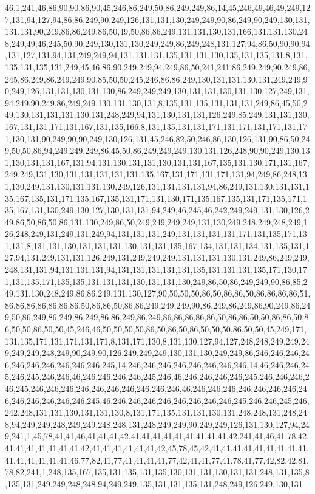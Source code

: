 46,1,241,46,86,90,90,86,90,45,246,86,249,50,86,249,249,86,14,45,246,49,46,49,249,127,131,94,127,94,86,86,249,90,249,126,131,131,130,249,249,90,86,249,90,249,130,131,131,131,90,249,86,86,249,86,50,49,50,86,86,249,131,131,130,131,166,131,131,130,248,249,49,46,245,50,90,249,130,131,130,249,249,86,249,248,131,127,94,86,50,90,90,94,131,127,131,94,131,249,249,94,131,131,131,135,131,131,130,135,131,135,131,8,131,135,131,135,131,249,45,46,86,90,249,249,94,249,86,50,241,241,86,249,249,90,249,86,245,86,249,86,249,249,90,85,50,50,245,246,86,86,249,130,131,131,130,131,249,249,90,249,126,131,131,130,131,130,86,249,249,249,130,131,131,130,131,130,127,249,131,94,249,90,249,86,249,249,130,131,130,131,8,135,131,135,131,131,131,249,86,45,50,249,130,131,131,131,130,131,248,249,94,131,130,131,131,126,249,85,249,131,131,130,167,131,131,171,131,167,131,135,166,8,131,135,131,131,171,131,171,131,171,131,171,130,131,90,249,90,90,249,130,126,131,45,246,82,50,246,86,130,126,131,90,86,50,249,50,50,86,94,249,249,249,86,45,50,86,249,249,249,130,131,126,248,90,90,249,130,131,130,131,131,167,131,94,131,130,131,131,130,131,131,167,135,131,130,171,131,167,249,249,131,130,131,131,131,131,131,135,167,131,171,131,171,131,94,249,86,248,131,130,249,131,130,131,131,130,249,126,131,131,131,131,94,86,249,131,130,131,131,135,167,135,131,171,135,167,135,131,171,131,130,171,135,167,135,131,171,135,171,135,167,131,130,249,130,127,130,131,131,94,249,46,245,46,242,249,249,131,130,126,249,86,50,86,50,86,131,130,249,86,50,249,249,249,249,131,130,249,248,249,248,249,126,248,249,131,249,131,249,94,131,131,131,249,131,131,131,131,171,131,135,171,131,131,8,131,131,130,131,131,131,130,131,131,135,167,134,131,131,134,131,135,131,127,94,131,249,131,131,126,249,131,249,249,249,131,131,131,130,131,249,86,249,249,248,131,131,94,131,131,131,94,131,131,131,131,131,135,131,131,131,135,171,130,171,131,135,171,135,135,131,131,131,130,131,131,130,249,86,50,86,249,249,90,86,85,249,131,130,248,249,86,86,249,131,130,127,90,50,50,50,86,50,86,86,50,86,86,86,86,51,86,86,86,86,86,86,86,50,86,86,50,86,86,249,249,249,90,86,249,86,249,86,90,249,86,249,50,86,249,86,249,86,249,86,86,249,86,249,86,86,86,86,86,50,86,86,50,50,86,86,50,86,50,50,86,50,50,45,246,46,50,50,50,50,86,50,86,50,86,50,50,50,86,50,50,45,249,171,131,135,171,131,171,131,171,8,131,171,130,8,131,130,127,94,127,248,248,249,249,249,249,249,248,249,90,249,90,126,249,249,249,130,131,130,249,249,86,246,246,246,246,246,246,246,246,246,246,245,14,246,246,246,246,246,246,246,246,14,46,246,246,245,246,245,246,246,46,246,246,246,246,245,246,46,246,246,246,246,245,246,246,246,246,245,246,246,246,246,246,246,246,246,246,246,46,246,246,246,246,246,246,246,246,246,246,246,246,246,245,46,246,246,246,246,246,246,246,246,245,246,246,245,246,242,248,131,131,130,131,131,130,8,131,171,135,131,131,130,131,248,248,131,248,248,94,249,249,248,249,249,248,248,131,248,249,249,90,249,249,126,131,130,127,94,249,241,1,45,78,41,41,46,41,41,41,42,41,41,41,41,41,41,41,41,41,42,241,41,46,41,78,42,41,41,41,41,41,41,41,42,41,41,41,41,41,41,42,45,78,45,42,41,41,41,41,41,41,41,41,41,41,41,41,41,41,41,46,77,82,41,77,41,41,41,41,77,42,41,41,77,41,78,41,77,42,82,42,81,78,82,241,1,248,135,167,135,131,135,131,135,130,131,131,130,131,131,248,131,135,8,135,131,249,249,248,248,94,249,249,135,131,131,135,131,248,249,126,249,130,131